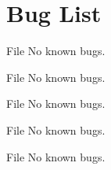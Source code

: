 \chapter{Bug List}
\hypertarget{bug}{}\label{bug}

\begin{DoxyRefList}
\item[File \doxylink{packet__header_8h}{packet\+\_\+header.h} ]\label{bug__bug000001}%
%
No known bugs.  
\item[File \doxylink{receiver_8c}{receiver.c} ]\label{bug__bug000002}%
%
No known bugs.  
\item[File \doxylink{receiver__tcp_8c}{receiver\+\_\+tcp.c} ]\label{bug__bug000004}%
%
No known bugs.  
\item[File \doxylink{sender_8c}{sender.c} ]\label{bug__bug000003}%
%
No known bugs.  
\item[File \doxylink{sender__tcp_8c}{sender\+\_\+tcp.c} ]\label{bug__bug000005}%
%
No known bugs. 
\end{DoxyRefList}